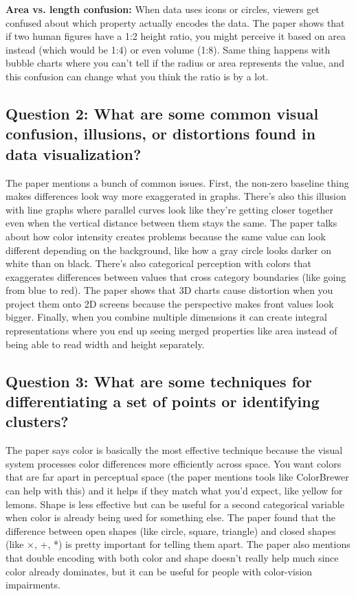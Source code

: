 \documentclass[11pt]{article}
\begin{document}
\textbf{Area vs. length confusion:} When data uses icons or circles, viewers get confused about which property actually encodes the data. The paper shows that if two human figures have a 1:2 height ratio, you might perceive it based on area instead (which would be 1:4) or even volume (1:8). Same thing happens with bubble charts where you can't tell if the radius or area represents the value, and this confusion can change what you think the ratio is by a lot.

\subsection*{Question 2: What are some common visual confusion, illusions, or distortions found in data visualization?}

The paper mentions a bunch of common issues. First, the non-zero baseline thing makes differences look way more exaggerated in graphs. There's also this illusion with line graphs where parallel curves look like they're getting closer together even when the vertical distance between them stays the same. The paper talks about how color intensity creates problems because the same value can look different depending on the background, like how a gray circle looks darker on white than on black. There's also categorical perception with colors that exaggerates differences between values that cross category boundaries (like going from blue to red). The paper shows that 3D charts cause distortion when you project them onto 2D screens because the perspective makes front values look bigger. Finally, when you combine multiple dimensions it can create integral representations where you end up seeing merged properties like area instead of being able to read width and height separately.

\subsection*{Question 3: What are some techniques for differentiating a set of points or identifying clusters?}

The paper says color is basically the most effective technique because the visual system processes color differences more efficiently across space. You want colors that are far apart in perceptual space (the paper mentions tools like ColorBrewer can help with this) and it helps if they match what you'd expect, like yellow for lemons. Shape is less effective but can be useful for a second categorical variable when color is already being used for something else. The paper found that the difference between open shapes (like circle, square, triangle) and closed shapes (like ×, +, *) is pretty important for telling them apart. The paper also mentions that double encoding with both color and shape doesn't really help much since color already dominates, but it can be useful for people with color-vision impairments.
\end{document}
